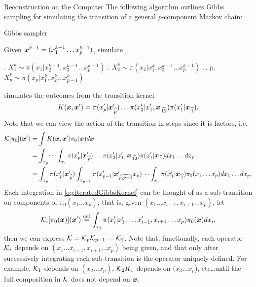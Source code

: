 \begin{chapter}{Reconstruction on the Computer}
The following algorithm outlines Gibbs sampling for simulating the transition of a general $p$-component Markov chain:
\begin{algorithm}
\caption{Gibbs sampler} \label{alg:gibbs}
  Given $\mbox{\boldmath$x$}^{k-1} = (x_1^{k-1}\dots x_p^{k-1})$, simulate
\begin{algorithmic}[0]
  . $X_1^{k} \sim \pi(x_1|x_2^{k-1},x_3^{k-1}\dots x_p^{k-1})$
  . $X_2^{k} \sim \pi(x_2|x_1^k,x_3^{k-1}\dots x_p^{k-1})$ 
  \STATE \dots
  \STATE p. $X_p^{k} \sim \pi(x_p|x_1^k,x_2^{k}\dots x_{p-1}^{k})$
\end{algorithmic}
\end{algorithm}

 simulates the outcomes from the transition kernel 
\begin{equation}
  K(\mbox{\boldmath$x$},\mbox{\boldmath$x$}') = \pi(x_p'|\mbox{\boldmath$x$}_{\,\widehat{p}}')\dots\pi(x_2'|x_1',\mbox{\boldmath$x$}_{\,\widehat{12}})\pi(x_1'|\mbox{\boldmath$x$}_{\,\widehat{1}}).
\end{equation}
Note that we can view the action of the transition in steps since it is factors, i.e.
\begin{align}
  \mathcal K [\pi_0](\mbox{\boldmath$x$}') 
    &= \int K(\mbox{\boldmath$x$},\mbox{\boldmath$x$}') \pi_0(\mbox{\boldmath$x$}) d\mbox{\boldmath$x$} \nonumber \\
    &= \int_{x_p}\dots\int_{x_1} \pi(x_p'|\mbox{\boldmath$x$}_{\,\widehat{p}}')\dots\pi(x_2'|x_1',\mbox{\boldmath$x$}_{\,\widehat{12}})\pi(x_1'|\mbox{\boldmath$x$}_{\,\widehat{1}})dx_1\dots dx_p \nonumber\\ 
    &= \int_{x_p}\pi(x_p'|\mbox{\boldmath$x$}_{\,\widehat{p}}')\int_{x_{p-1}} \pi(x_{p-1}'|\mbox{\boldmath$x$}_{\,\widehat{p,p-1}}'x_p)\dots\int_{x_1} \pi(x_1'|\mbox{\boldmath$x$}_{\,\widehat{1}}) \pi_0(x_1\dots x_p)dx_1\dots dx_p. \label{eq:iteratedGibbsKernel}
\end{align}
Each integration in \eqref{eq:iteratedGibbsKernel} can be thought of as a sub-transition on components of $\pi_0(x_1\dots x_p)$; that is, given $(x_1\dots x_{i-1},x_{i+1}\dots x_p)$, let
\begin{equation}
  \mathcal K_i[\pi_0(\mbox{\boldmath$x$})](\mbox{\boldmath$x$}') \stackrel{\rm def}{=} \int_{x_i} \pi(x_i'|x_1',\dots x_{i-1}',x_{i+1}\dots x_p) \pi_0(\mbox{\boldmath$x$})dx_i,
\end{equation}
then we can express $\mathcal K = \mathcal K_p\mathcal K_{p-1} \dots \mathcal K_1$.
Note that, functionally, each operator $\mathcal K_i$ depends on $(x_1\dots x_{i-1},x_{i+1}\dots x_p)$ being given, and that only after successively integrating each sub-transition is the operator uniquely defined.
For example, $\mathcal K_1$ depends on $(x_2\dots x_p)$, $\mathcal K_2 K_1$ depends on $(x_3\dots x_p$), etc\dots until the full composition in $\mathcal K$ does not depend on $\mbox{\boldmath$x$}$.


\end{chapter}
